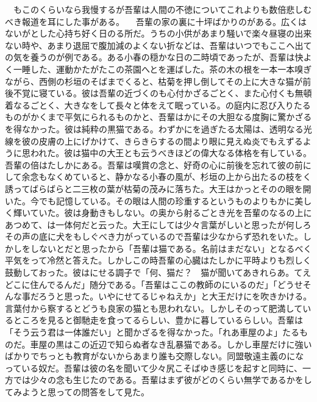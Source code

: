 \documentclass[a5j]{ltjbook}
\begin{document}
　もこのくらいなら我慢するが吾輩は人間の不徳についてこれよりも数倍悲しむべき報道を耳にした事がある。 \newline
　吾輩の家の裏に十坪ばかりのがある。広くはないがとした心持ち好く日のる所だ。うちの小供があまり騒いで楽々昼寝の出来ない時や、あまり退屈で腹加減のよくない折などは、吾輩はいつでもここへ出ての気を養うのが例である。ある小春の穏かな日の二時頃であったが、吾輩は快よく一睡した、運動かたがたこの茶園へとを運ばした。茶の木の根を一本一本嗅ぎながら、西側の杉垣のそばまでくると、枯菊を押し倒してその上に大きな猫が前後不覚に寝ている。彼は吾輩の近づくのも心付かざるごとく、また心付くも無頓着なるごとく、大きなをして長々と体をえて眠っている。の庭内に忍び入りたるものがかくまで平気にられるものかと、吾輩はかにその大胆なる度胸に驚かざるを得なかった。彼は純粋の黒猫である。わずかにを過ぎたる太陽は、透明なる光線を彼の皮膚の上にげかけて、きらきらするの間より眼に見えぬ炎でもえずるように思われた。彼は猫中の大王とも云うべきほどの偉大なる体格を有している。吾輩の倍はたしかにある。吾輩は嘆賞の念と、好奇の心に前後を忘れて彼の前にして余念もなくめていると、静かなる小春の風が、杉垣の上から出たるの枝をく誘ってばらばらと二三枚の葉が枯菊の茂みに落ちた。大王はかっとそのの眼を開いた。今でも記憶している。その眼は人間の珍重するというものよりもかに美しく輝いていた。彼は身動きもしない。の奥から射るごとき光を吾輩のなるの上にあつめて、は一体何だと云った。大王にしては少々言葉がしいと思ったが何しろその声の底に犬をもしぐべき力がっているので吾輩は少なからず恐れをいた。しかしをしないとだと思ったから「吾輩は猫である。名前はまだない」となるべく平気をって冷然と答えた。しかしこの時吾輩の心臓はたしかに平時よりも烈しく鼓動しておった。彼はにせる調子で「何、猫だ？　猫が聞いてあきれらあ。てえどこに住んでるんだ」随分である。「吾輩はここの教師のにいるのだ」「どうせそんな事だろうと思った。いやにせてるじゃねえか」と大王だけにを吹きかける。言葉付から察するとどうも良家の猫とも思われない。しかしそのって肥満しているところを見ると御馳走を食ってるらしい、豊かに暮しているらしい。吾輩は「そう云う君は一体誰だい」と聞かざるを得なかった。「れあ車屋のよ」たるものだ。車屋の黒はこの近辺で知らぬ者なき乱暴猫である。しかし車屋だけに強いばかりでちっとも教育がないからあまり誰も交際しない。同盟敬遠主義のになっている奴だ。吾輩は彼の名を聞いて少々尻こそばゆき感じを起すと同時に、一方では少々の念も生じたのである。吾輩はまず彼がどのくらい無学であるかをしてみようと思っての問答をして見た。 \newline
\end{document}
